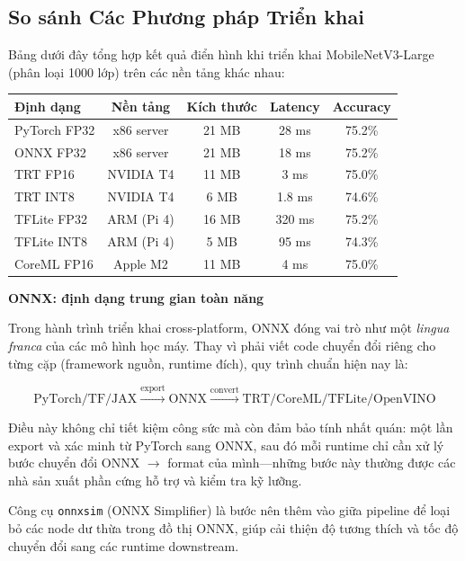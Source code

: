 \subsection*{So sánh Các Phương pháp Triển khai}

Bảng dưới đây tổng hợp kết quả điển hình khi triển khai MobileNetV3-Large (phân loại 1000 lớp) trên các nền tảng khác nhau:

\begin{center}
\begin{tabular}{lcccc}
\hline
\textbf{Định dạng} & \textbf{Nền tảng} & \textbf{Kích thước} & \textbf{Latency} & \textbf{Accuracy} \\
\hline
PyTorch FP32  & x86 server    & 21 MB  & 28 ms  & 75.2\% \\
ONNX FP32     & x86 server    & 21 MB  & 18 ms  & 75.2\% \\
TRT FP16      & NVIDIA T4     & 11 MB  & 3 ms   & 75.0\% \\
TRT INT8      & NVIDIA T4     & 6 MB   & 1.8 ms & 74.6\% \\
TFLite FP32   & ARM (Pi 4)    & 16 MB  & 320 ms & 75.2\% \\
TFLite INT8   & ARM (Pi 4)    & 5 MB   & 95 ms  & 74.3\% \\
CoreML FP16   & Apple M2      & 11 MB  & 4 ms   & 75.0\% \\
\hline
\end{tabular}
\end{center}

\begin{mdframed}[style=infobox]
\textbf{ONNX: định dạng trung gian toàn năng}

Trong hành trình triển khai cross-platform, ONNX đóng vai trò như một \textit{lingua franca} của các mô hình học máy. Thay vì phải viết code chuyển đổi riêng cho từng cặp (framework nguồn, runtime đích), quy trình chuẩn hiện nay là:

\[
\text{PyTorch/TF/JAX} \xrightarrow{\text{export}} \text{ONNX} \xrightarrow{\text{convert}} \text{TRT/CoreML/TFLite/OpenVINO}
\]

Điều này không chỉ tiết kiệm công sức mà còn đảm bảo tính nhất quán: một lần export và xác minh từ PyTorch sang ONNX, sau đó mỗi runtime chỉ cần xử lý bước chuyển đổi ONNX $\rightarrow$ format của mình---những bước này thường được các nhà sản xuất phần cứng hỗ trợ và kiểm tra kỹ lưỡng.

Công cụ \texttt{onnxsim} (ONNX Simplifier) là bước nên thêm vào giữa pipeline để loại bỏ các node dư thừa trong đồ thị ONNX, giúp cải thiện độ tương thích và tốc độ chuyển đổi sang các runtime downstream.
\end{mdframed}
